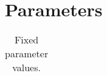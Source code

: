 \documentclass{article}
\begin{document}

\section{Parameters}


\begin{table}
    \begin{tabularx}{\textwidth}{| X | X |}
    \hline
     \\
    \hline
    \end{tabularx}
	\caption{Fixed parameter values.}
    \label{tab:fixed_params}
\end{table}

\newpage    
\printbibliography
\end{document}
